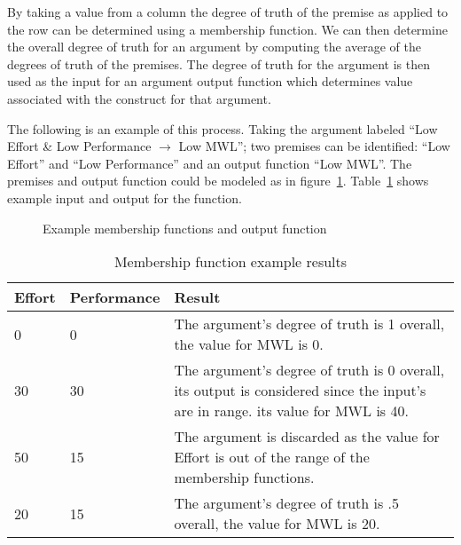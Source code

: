 By taking a value from a column the degree of truth of the premise as applied to the row can be determined using a membership function. We can then determine the overall degree of truth for an argument by computing the average of the degrees of truth of the premises. The degree of truth for the argument is then used as the input for an argument output function which determines value associated with the construct for that argument.

The following is an example of this process. Taking the argument labeled ``Low Effort \& Low Performance $\rightarrow$ Low MWL''; two premises can be identified: ``Low Effort'' and ``Low Performance'' and an output function ``Low MWL''. The premises and output function could be modeled as in figure~\ref{fig:membership_functions}. Table~\ref{tab:memfunc_ex} shows example input and output for the function. 


\begin{figure}
    \centering
    \hfill
    \caption{Example membership functions and output function}
    \label{fig:membership_functions}
\end{figure}

\begin{table}[]
\begin{center}
  \begin{tabular}{ | l | l | p{8cm} |}
    \hline 
Effort & Performance & Result \\ \hline
0 & 0 & The argument's degree of truth is 1 overall, the value for MWL is 0. \\
30 & 30 & The argument's degree of truth is 0 overall, its output is considered since the input's are in range. its value for MWL is 40. \\
50 & 15 & The argument is discarded as the value for Effort is out of the range of the membership functions. \\
20 & 15 & The argument's degree of truth is .5 overall, the value for MWL is 20. \\
    \hline
  \end{tabular}
\end{center}
\caption{Membership function example results}
\label{tab:memfunc_ex}
\end{table}

